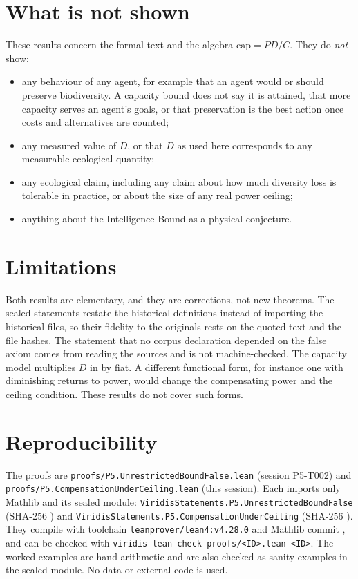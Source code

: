 \documentclass[11pt]{article}
\theoremstyle{remark}
\begin{document}
\section{What is not shown}
These results concern the formal text and the algebra $\mathrm{cap}=PD/C$. They do \emph{not}
show:
\begin{itemize}
\item any behaviour of any agent, for example that an agent would or should preserve
  biodiversity. A capacity bound does not say it is attained, that more capacity serves an
  agent's goals, or that preservation is the best action once costs and alternatives are counted;
\item any measured value of $D$, or that $D$ as used here corresponds to any measurable ecological
  quantity;
\item any ecological claim, including any claim about how much diversity loss is tolerable in
  practice, or about the size of any real power ceiling;
\item anything about the Intelligence Bound as a physical conjecture.
\end{itemize}

\section{Limitations}
Both results are elementary, and they are corrections, not new theorems. The sealed statements
restate the historical definitions instead of importing the historical files, so their fidelity
to the originals rests on the quoted text and the file hashes. The statement that no corpus
declaration depended on the false axiom comes from reading the sources and is not machine-checked.
The capacity model multiplies $D$ in by fiat. A different functional form, for instance one with
diminishing returns to power, would change the compensating power and the ceiling condition.
These results do not cover such forms.

\section{Reproducibility}
The proofs are \texttt{proofs/P5.UnrestrictedBoundFalse.lean} (session P5-T002) and
\texttt{proofs/P5.CompensationUnderCeiling.lean} (this session). Each imports only Mathlib and
its sealed module: \texttt{ViridisStatements.P5.UnrestrictedBoundFalse} (SHA-256
) and
\texttt{ViridisStatements.P5.CompensationUnderCeiling} (SHA-256
). They compile with
toolchain \texttt{leanprover/lean4:v4.28.0} and Mathlib commit
, and can be checked with
\texttt{viridis-lean-check proofs/<ID>.lean <ID>}. The worked examples are hand arithmetic and
are also checked as sanity examples in the sealed module. No data or external code is used.
\end{document}
